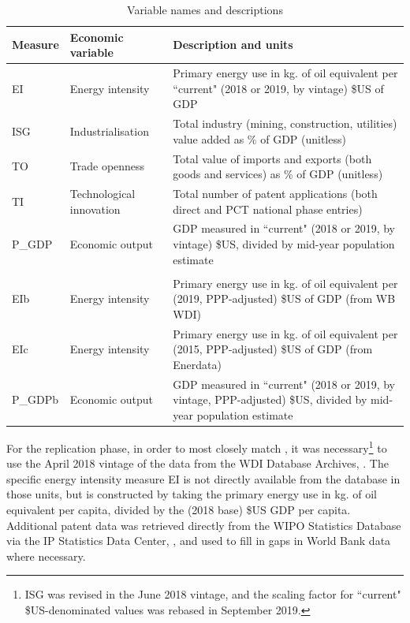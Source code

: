 \documentclass[11pt,a4paper]{article}
\begin{document}
\begin{table}[htbp]
\centering
\begin{tabulary}{\textwidth}{l l L} 
 \toprule 
 Measure & Economic variable & Description and units \\ [1ex] 
 \midrule 
 EI & Energy intensity & Primary energy use in kg. of oil equivalent per ``current" (2018 or 2019, by vintage) \$US of GDP \\ 
 ISG & Industrialisation & Total industry (mining, construction, utilities) value added as \% of GDP (unitless) \\
 TO & Trade openness & Total value of imports and exports (both goods and services) as \% of GDP (unitless) \\ 
 TI & Technological innovation & Total number of patent applications (both direct and PCT national phase entries) \\ 
 P\_GDP & Economic output & GDP measured in ``current" (2018 or 2019, by vintage) \$US, divided by mid-year population estimate\\
\hline \\ 
   EIb & Energy intensity & Primary energy use in kg. of oil equivalent per (2019, PPP-adjusted) \$US of GDP (from WB WDI) \\ 
 EIc & Energy intensity & Primary energy use in kg. of oil equivalent per (2015, PPP-adjusted) \$US of GDP (from Enerdata) \\ 
 P\_GDPb & Economic output & GDP measured in ``current" (2018 or 2019, by vintage, PPP-adjusted) \$US, divided by mid-year population estimate\\ 

 \bottomrule 
\end{tabulary}
\caption{Variable names and descriptions}
\label{tab:data_source}
\end{table}

For the replication phase, in order to most closely match \cite{panHowIndustrializationTrade2019}, it was necessary\footnote{
ISG was revised in the June 2018 vintage, and the scaling factor for ``current" \$US-denominated values was rebased in September 2019.
} to use the April 2018 vintage of the data from the WDI Database Archives, \cite{theworldbankWDIDatabaseArchives2018}.
The specific energy intensity measure EI is not directly available from the database in those units, but is constructed by taking the primary energy use in kg. of oil equivalent per capita, divided by the (2018 base) \$US GDP per capita.
Additional patent data was retrieved directly from the WIPO Statistics Database via the IP Statistics Data Center, \cite{wipoWIPOStatisticsDatabase2020}, and used to fill in gaps in World Bank data where necessary.
\end{document}
